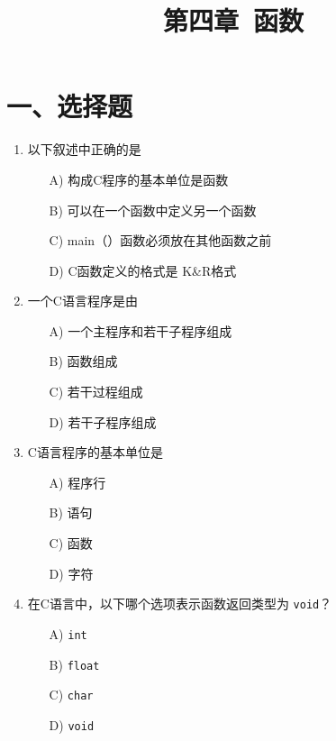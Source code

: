 \documentclass[a4paper,12pt]{article}
\title{\textbf{第四章\ 函数}}
\author{}
\date{}
\begin{document}
\maketitle

\section*{一、选择题}

\begin{enumerate}
	\item 以下叙述中正确的是
	      \begin{enumerate}
		      \item[A)] 构成C程序的基本单位是函数
		      \item[B)] 可以在一个函数中定义另一个函数
		      \item[C)] main（）函数必须放在其他函数之前
		      \item[D)] C函数定义的格式是 K\&R格式
	      \end{enumerate}
	      \vspace{0.3cm}

	\item 一个C语言程序是由
	      \begin{enumerate}
		      \item[A)] 一个主程序和若干子程序组成
		      \item[B)] 函数组成
		      \item[C)] 若干过程组成
		      \item[D)] 若干子程序组成
	      \end{enumerate}
	      \vspace{0.3cm}

	\item C语言程序的基本单位是
	      \begin{enumerate}
		      \item[A)] 程序行
		      \item[B)] 语句
		      \item[C)] 函数
		      \item[D)] 字符
	      \end{enumerate}
	      \vspace{0.3cm}

	\item 在C语言中，以下哪个选项表示函数返回类型为 \texttt{void}？
	      \begin{enumerate}
		      \item[A)] \texttt{int}
		      \item[B)] \texttt{float}
		      \item[C)] \texttt{char}
		      \item[D)] \texttt{void}
	      \end{enumerate}
	      \vspace{0.3cm}


\end{enumerate}
\end{document}
